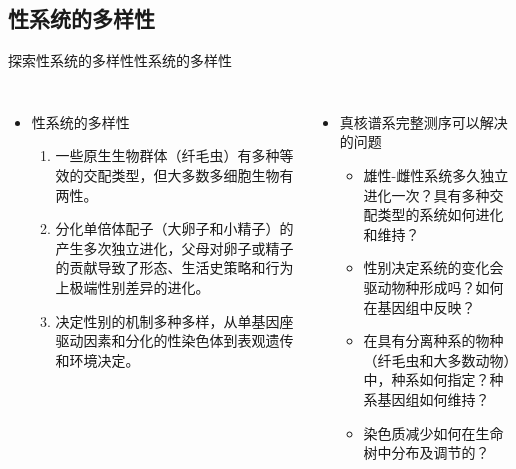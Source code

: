\documentclass{beamer}
\begin{document}
	\subsection*{性系统的多样性}
	\begin{frame}{探索性系统的多样性}{性系统的多样性}
		\begin{columns}
			\begin{itemize}
				\item 性系统的多样性
				\begin{enumerate}
					\item 一些原生生物群体（纤毛虫）有多种等效的交配类型，但大多数多细胞生物有两性。
					\item 分化单倍体配子（大卵子和小精子）的产生多次独立进化，父母对卵子或精子的贡献导致了形态、生活史策略和行为上极端性别差异的进化。
					\item 决定性别的机制多种多样，从单基因座驱动因素和分化的性染色体到表观遗传和环境决定。
				\end{enumerate}
			\end{itemize}

			\begin{itemize}
				\item 真核谱系完整测序可以解决的问题
				\begin{itemize}
					\item 雄性-雌性系统多久独立进化一次？具有多种交配类型的系统如何进化和维持？
					\item 性别决定系统的变化会驱动物种形成吗？如何在基因组中反映？
					\item 在具有分离种系的物种（纤毛虫和大多数动物）中，种系如何指定？种系基因组如何维持？
					\item 染色质减少如何在生命树中分布及调节的？
					
				\end{itemize}
			\end{itemize}
		\end{columns}
	\end{frame}

\end{document}
